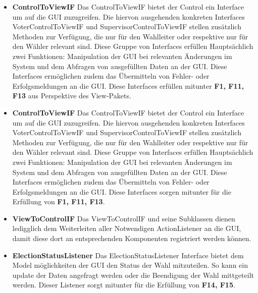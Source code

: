 \documentclass[parskip=full]{scrartcl}
\newcommand{\fakeparagraph}[1]{\textbf{#1}}
\begin{document}
	\begin{itemize}
	\item\fakeparagraph{ControlToViewIF} Das ControlToViewIF bietet der Control ein Interface um auf die GUI zuzugreifen.
	Die hiervon ausgehenden konkreten Interfaces VoterControlToViewIF und SupervisorControlToViewIF stellen zusätzlich Methoden zur Verfügung, die nur für den Wahlleiter oder respektive nur für den Wähler relevant sind. 
	Diese Gruppe von Interfaces erfüllen Hauptsächlich zwei Funktionen: Manipulation der GUI bei relevanten Änderungen im System und dem Abfragen von ausgefüllten Daten an der GUI.
	Diese Interfaces ermöglichen zudem das Übermitteln von Fehler- oder Erfolgsmeldungen an die GUI.
	Diese Interfaces erfüllen mitunter \textbf{F1, F11, F13} aus Perspektive des View-Pakets.
	\end{itemize} 
	\begin{itemize}
	\item\fakeparagraph{ControlToViewIF} Das ControlToViewIF bietet der Control ein Interface um auf die GUI zuzugreifen.
	Die hiervon ausgehenden konkreten Interfaces VoterControlToViewIF und SupervisorControlToViewIF stellen zusätzlich Methoden zur Verfügung, die nur für den Wahlleiter oder respektive nur für den Wähler relevant sind. 
	Diese Gruppe von Interfaces erfüllen Hauptsächlich zwei Funktionen: Manipulation der GUI bei relevanten Änderungen im System und dem Abfragen von ausgefüllten Daten an der GUI.
	Diese Interfaces ermöglichen zudem das Übermitteln von Fehler- oder Erfolgsmeldungen an die GUI.
	Diese Interfaces sorgen mitunter für die Erfüllung von \textbf{F1, F11, F13}.
	\end{itemize} 
	\begin{itemize}
	\item\fakeparagraph{ViewToControlIF} Das ViewToControlIF und seine Subklassen dienen ledigglich dem Weiterleiten aller Notwendigen ActionListener an die GUI, damit diese dort an entsprechenden Komponenten registriert werden können.
	\end{itemize} 
	\begin{itemize}
	\item\fakeparagraph{ElectionStatusListener} Das ElectionStatusListener Interface bietet dem Model möglichkeiten der GUI den Status der Wahl mitzuteilen. So kann ein update der Daten angefragt werden oder die Beendigung der Wahl mittgeteilt werden.
	Dieser Listener sorgt mitunter für die Erfüllung von \textbf{F14, F15}.
	\end{itemize} 
  
\end{document}
